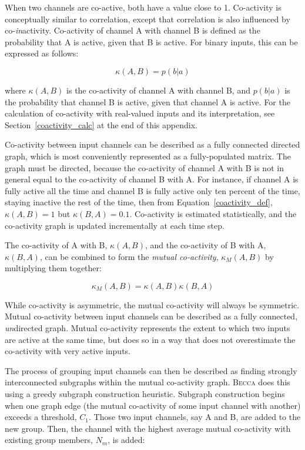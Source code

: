 When two channels are co-active, both have a value close to 1. Co-activity is conceptually similar to correlation, except that correlation is also influenced by co-{\em in}activity. Co-activity of channel A with channel B is defined as the probability that A is active, given that B is active. For binary inputs, this can be expressed as follows:

\begin{equation}
\kappa(A,B) = p(b|a)
\label{coactivity_def}
\end{equation}

where $\kappa(A,B)$ is the co-activity of channel A with channel B, and $p(b|a)$ is the probability that channel B is active, given that channel A is active. For the calculation of co-activity with real-valued inputs and its interpretation, see Section~\ref{coactivity_calc} at the end of this appendix. 

Co-activity between input channels can be described as a fully connected directed graph, which is most conveniently represented as a fully-populated matrix. The graph must be directed, because the co-activity of channel A with B is not in general equal to the co-activity of channel B with A. For instance, if channel A is fully active all the time and channel B is fully active only ten percent of the time, staying inactive the rest of the time, then from Equation~\ref{coactivity_def}, $\kappa(A,B) = 1$ but $\kappa(B,A) = 0.1$. Co-activity is estimated statistically, and the co-activity graph is updated incrementally at each time step. 

The co-activity of A with B,  $\kappa(A,B) $,  and the co-activity of B with A, $\kappa(B,A) $, can be combined to form the {\em mutual co-activity},  $\kappa_M(A,B) $ by multiplying them together:

\begin{equation}
\kappa_M(A,B)   = \kappa(A,B) \kappa(B,A) 
\end{equation}

While co-activity is asymmetric, the mutual co-activity will always be symmetric. Mutual co-activity between input channels can be described as a fully connected, {\em un}directed graph. Mutual co-activity represents the extent to which two inputs are active at the same time, but does so in a way that does not overestimate the co-activity with very active inputs.

The process of grouping input channels can then be described as finding strongly interconnected subgraphs within the mutual co-activity graph. \textsc{Becca} does this using a greedy subgraph construction heuristic. Subgraph construction begins when one graph edge (the mutual co-activity of some input channel with another) exceeds a threshold, $C_1$. Those two input channels, say A and B, are added to the new group. Then, the channel with the highest average mutual co-activity with existing group members, $N_m$, is added:

